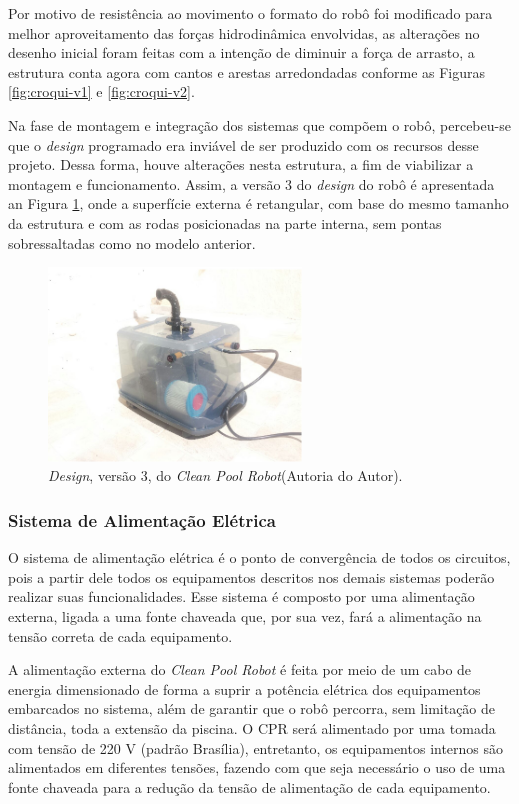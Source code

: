 Por motivo de resistência ao movimento o formato do robô foi modificado para
melhor aproveitamento das forças hidrodinâmica envolvidas, as alterações no
desenho inicial foram feitas com a intenção de diminuir a força de arrasto, a
estrutura conta agora com cantos e arestas arredondadas conforme as
Figuras \ref{fig:croqui-v1} e \ref{fig:croqui-v2}.

Na fase de montagem e integração dos sistemas que compõem o robô, percebeu-se
que o \textit{design} programado era inviável de ser produzido com os recursos
desse projeto. Dessa forma, houve alterações nesta estrutura, a fim de viabilizar
a montagem e funcionamento. Assim, a versão 3 do \textit{design} do robô é
apresentada an Figura \ref{fig:cpr-v3}, onde a superfície externa é retangular, com base do mesmo
tamanho da estrutura e com as rodas posicionadas na parte interna, sem pontas
sobressaltadas como no modelo anterior.

\begin{figure}[h]
  \centering
  \includegraphics[width=0.6\textwidth]{figuras/cpr-v3.png}
  \caption{\textit{Design}, versão 3, do \textit{Clean Pool Robot}(\textsf{Autoria do Autor}).}
  \label{fig:cpr-v3}
\end{figure}
\FloatBarrier

\subsubsection{Sistema de Alimentação Elétrica}
O sistema de alimentação elétrica é o ponto de convergência de todos os circuitos,
pois a partir dele todos os equipamentos descritos nos demais sistemas poderão
realizar suas funcionalidades. Esse sistema é composto por uma alimentação
externa, ligada a uma fonte chaveada que, por sua vez, fará a alimentação na
tensão correta de cada equipamento.

A alimentação externa do \textit{Clean Pool Robot} é feita por meio de um cabo
de energia dimensionado de forma a suprir a potência elétrica dos equipamentos
embarcados no sistema, além de garantir que o robô percorra, sem limitação de
distância, toda a extensão da piscina. O CPR será alimentado por uma tomada
com tensão de 220 V (padrão Brasília), entretanto, os equipamentos internos são
alimentados em diferentes tensões, fazendo com que seja necessário o uso de uma
fonte chaveada para a redução da tensão de alimentação de cada equipamento.

